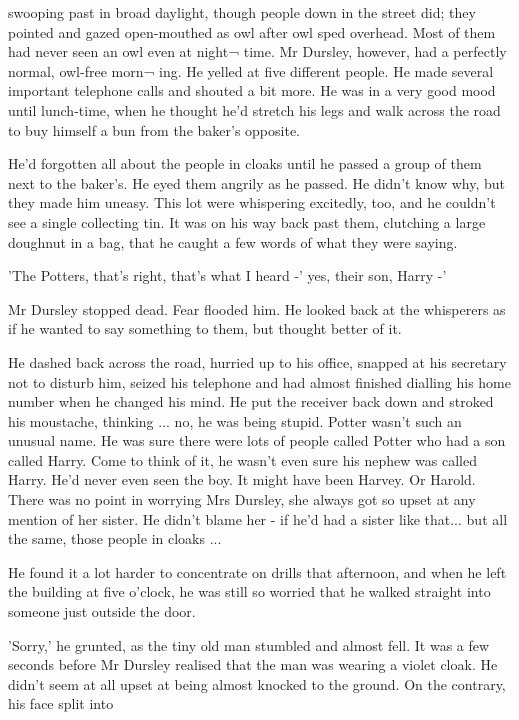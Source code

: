 \documentclass[twoside, openany]{report}
\begin{document}
swooping past in broad daylight, though people down in the 
street did; they pointed and gazed open-mouthed as owl after owl 
sped overhead. Most of them had never seen an owl even at night¬ 
time. Mr Dursley, however, had a perfectly normal, owl-free morn¬ 
ing. He yelled at five different people. He made several important 
telephone calls and shouted a bit more. He was in a very good 
mood until lunch-time, when he thought he'd stretch his legs 
and walk across the road to buy himself a bun from the baker's 
opposite. 

He'd forgotten all about the people in cloaks until he passed a 
group of them next to the baker's. He eyed them angrily as he 
passed. He didn't know why, but they made him uneasy. This lot 
were whispering excitedly, too, and he couldn't see a single 
collecting tin. It was on his way back past them, clutching a large 
doughnut in a bag, that he caught a few words of what they were 
saying. 

'The Potters, that's right, that's what I heard -' 
yes, their son, Harry -' 

Mr Dursley stopped dead. Fear flooded him. He looked back at 
the whisperers as if he wanted to say something to them, but 
thought better of it.\cite{Wong2023} 

He dashed back across the road, hurried up to his office, 
snapped at his secretary not to disturb him, seized his telephone 
and had almost finished dialling his home number when he 
changed his mind. He put the receiver back down and stroked his 
moustache, thinking ... no, he was being stupid. Potter wasn't 
such an unusual name. He was sure there were lots of people 
called Potter who had a son called Harry. Come to think of it, he 
wasn't even sure his nephew was called Harry. He'd never even 
seen the boy. It might have been Harvey. Or Harold. There was no 
point in worrying Mrs Dursley, she always got so upset at any 
mention of her sister. He didn't blame her - if he'd had a sister like 
that... but all the same, those people in cloaks ... 

He found it a lot harder to concentrate on drills that afternoon, 
and when he left the building at five o'clock, he was still so 
worried that he walked straight into someone just outside the door. 

'Sorry,' he grunted, as the tiny old man stumbled and almost 
fell. It was a few seconds before Mr Dursley realised that the man 
was wearing a violet cloak. He didn't seem at all upset at being 
almost knocked to the ground. On the contrary, his face split into 
\end{document}
